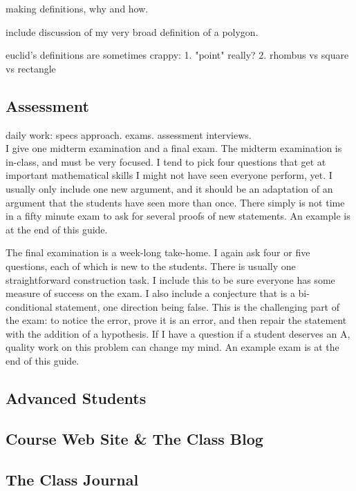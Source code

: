 \documentclass{tufte-handout}
\theoremstyle{definition}
\begin{document}
making definitions, why and how. 

include discussion of my very broad definition of a polygon.

euclid's definitions are sometimes crappy:
1. "point" really?
2. rhombus vs square vs rectangle




\subsection{Assessment}

daily work: specs approach. exams. assessment interviews.\\


I give one midterm examination and a final exam.
The midterm examination is in-class, and must be very focused.
I tend to pick four questions that get at important mathematical skills I might not have seen everyone perform, yet.
I usually only include one new argument, and it should be an adaptation of an argument that the students have seen more than once.
There simply is not time in a fifty minute exam to ask for several proofs of new statements.
An example is at the end of this guide.

The final examination is a week-long take-home.
I again ask four or five questions, each of which is new to the students.
There is usually one straightforward construction task.
I include this to be sure everyone has some measure of success on the exam.
I also include a conjecture that is a bi-conditional statement, one direction being false.
This is the challenging part of the exam: to notice the error, prove it is an error, and then repair the statement with the addition of a hypothesis.
If I have a question if a student deserves an A, quality work on this problem can change my mind.
An example exam is at the end of this guide.

\subsection{Advanced Students}

\subsection{Course Web Site \& The Class Blog}


\subsection{The Class Journal}
\end{document}
